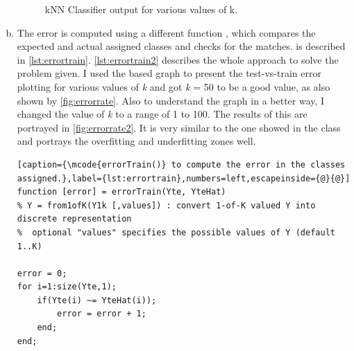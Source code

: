 \documentclass[a4paper, 11pt]{article}
\begin{document}
\begin{enumerate}[(a)]
\begin{figure}
{}
\caption[knnClasses]{kNN Classifier output for various values of k.}
\label{fig:knnClasses}
\end{figure}

\item The error is computed using a different function , which compares the expected and actual assigned classes and checks for the matches.  is described in \autoref{lst:errortrain}. \autoref{lst:errortrain2} describes the whole approach to solve the problem given. I used the  based graph to present the test-vs-train error plotting for various values of \textit{k} and got \textit{k} = 50 to be a good value, as also shown by \autoref{fig:errorrate}. Also to understand the graph in a better way, I changed the value of \textit{k} to a range of 1 to 100. The results of this are portrayed in \autoref{fig:errorrate2}. It is very similar to the one showed in the class and portrays the overfitting and underfitting zones well.
\vspace{-20pt}
\begin{lstlisting}[caption={\mcode{errorTrain()} to compute the error in the classes assigned.},label={lst:errortrain},numbers=left,escapeinside={@}{@}]
function [error] = errorTrain(Yte, YteHat)
% Y = from1ofK(Y1k [,values]) : convert 1-of-K valued Y into discrete representation
%  optional "values" specifies the possible values of Y (default 1..K)

error = 0;
for i=1:size(Yte,1);
    if(Yte(i) ~= YteHat(i));
        error = error + 1;
    end;
end;


\end{lstlisting}
\end{enumerate}
\end{document}
